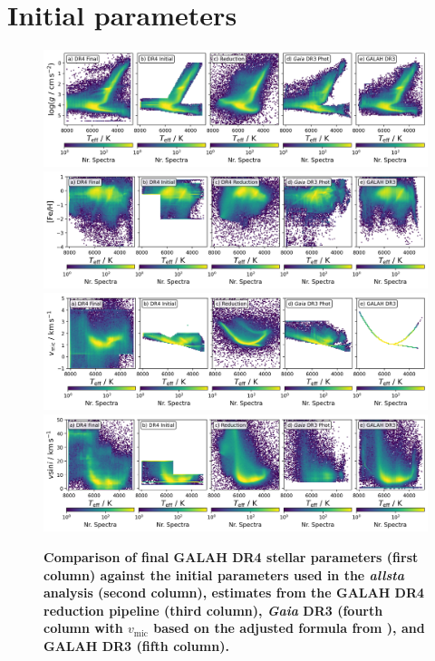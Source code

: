 \documentclass[
  journal=pasa,
  manuscript=research-paper, %
  year=2024,
  volume=37
]{cup-journal}
\newcommand{\vmic}{$v_\mathrm{mic}$\xspace}
\newcommand{\Gaia}{\textit{Gaia}\xspace}
\begin{document}
\section{Initial parameters}

\begin{figure}[ht]
 \centering
 \includegraphics[width=\textwidth]{figures/initial_teff_logg.png}
 \includegraphics[width=\textwidth]{figures/initial_teff_fe_h.png}
 \includegraphics[width=\textwidth]{figures/initial_teff_vmic.png}
 \includegraphics[width=\textwidth]{figures/initial_teff_vsini.png} \caption{\textbf{Comparison of final GALAH DR4 stellar parameters (first column) against the initial parameters used in the \textit{allsta} analysis (second column), estimates from the GALAH DR4 reduction pipeline (third column), \Gaia DR3 (fourth column with \vmic based on the adjusted formula from \citet{DutraFerreira2016}), and GALAH DR3 (fifth column).}} \label{fig:initial_parameters}
\end{figure}
\end{document}
